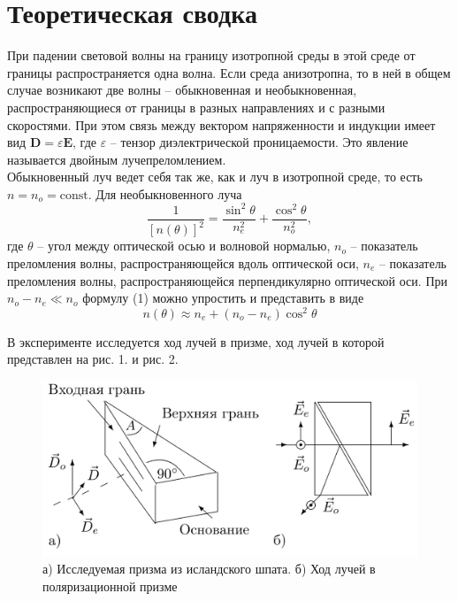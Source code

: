 \documentclass[a4paper,12pt]{article}
\begin{document}
\section*{Теоретическая сводка}
При падении световой волны на границу изотропной среды в этой среде от границы распространяется одна волна. Если среда анизотропна, то в ней в общем случае возникают две волны -- обыкновенная и необыкновенная, распространяющиеся от границы в разных направлениях и с разными скоростями. При этом связь между вектором напряженности и индукции имеет вид $\textbf{D} = \varepsilon \textbf{E}$, где $\varepsilon$ -- тензор диэлектрической проницаемости. Это явление называется двойным лучепреломлением. \\
Обыкновенный луч ведет себя так же, как и луч в изотропной среде, то есть $n = n_o = \text{const}$. Для необыкновенного луча 
\begin{equation}
    \frac{1}{[n(\theta)]^2} = \frac{\sin^2 \theta}{n_e^2} + \frac{\cos^2 \theta}{n_o^2},
\end{equation}
где $\theta$ -- угол между оптической осью и волновой нормалью, $n_o$ -- показатель преломления волны, распространяющейся вдоль оптической оси, $n_e$ -- показатель преломления волны, распространяющейся перпендикулярно оптической оси. При $n_o - n_e \ll n_o$ формулу (1) можно упростить и представить в виде
\begin{equation}
    n(\theta) \approx n_e + (n_o - n_e)\cos^2 \theta
\end{equation}

\noindent В эксперименте исследуется ход лучей в призме, ход лучей в которой представлен на рис. 1. и рис. 2.

\begin{figure}[H]
    \centering
    \includegraphics[scale=0.25]{shpat.png}
    \centering
    \caption{а) Исследуемая призма из исландского шпата. б) Ход лучей в поляризационной призме}
\end{figure}
\end{document}
